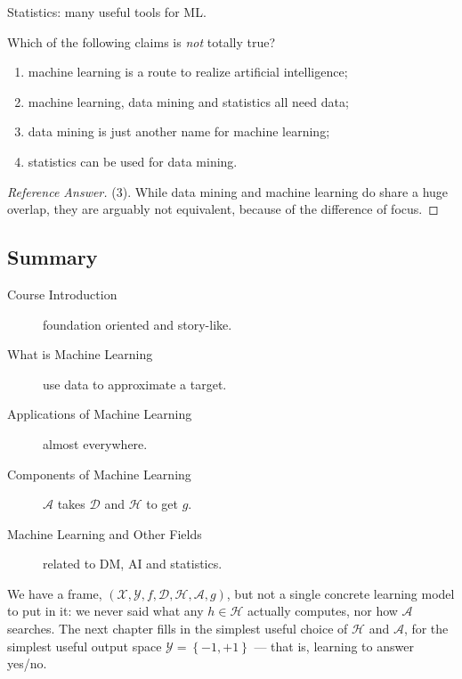 \begin{moral}
    Statistics: many useful tools for ML.
\end{moral}

\begin{exercise}
    Which of the following claims is \emph{not} totally true?
    \begin{enumerate}[(1)]
        \item machine learning is a route to realize artificial intelligence;
        \item machine learning, data mining and statistics all need data;
        \item data mining is just another name for machine learning;
        \item statistics can be used for data mining.
    \end{enumerate}
\end{exercise}

\begin{proof}[Reference Answer]
    (3). While data mining and machine learning do share a huge overlap, they
    are arguably not equivalent, because of the difference of focus.
\end{proof}

\hrulebar

\subsection*{Summary}

\begin{description}
    \item[Course Introduction] foundation oriented and story-like.
    \item[What is Machine Learning] use data to approximate a target.
    \item[Applications of Machine Learning] almost everywhere.
    \item[Components of Machine Learning] \(\mathcal{A}\) takes \(\mathcal{D}\)
        and \(\mathcal{H}\) to get \(g\).
    \item[Machine Learning and Other Fields] related to DM, AI and statistics.
\end{description}

We have a frame, \((\mathcal{X}, \mathcal{Y}, f, \mathcal{D}, \mathcal{H},
\mathcal{A}, g)\), but not a single concrete learning model to put in it: we
never said what any \(h \in \mathcal{H}\) actually computes, nor how
\(\mathcal{A}\) searches. The next chapter fills in the simplest useful choice
of \(\mathcal{H}\) and \(\mathcal{A}\), for the simplest useful output space
\(\mathcal{Y} = \left\{ -1, +1 \right\}\) --- that is, learning to answer
yes/no.
